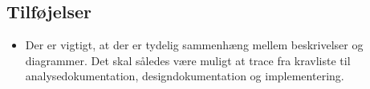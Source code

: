 \documentclass[../main.tex]{subfiles}
\begin{document}
\begin{enumerate}
\subsection{Tilføjelser}

\begin{itemize}
    \item Der er vigtigt, at der er tydelig sammenhæng mellem beskrivelser og diagrammer. Det skal således være muligt at trace fra kravliste til analysedokumentation, designdokumentation og implementering. 
\end{itemize}


\end{enumerate}

\hfill
\end{document}
